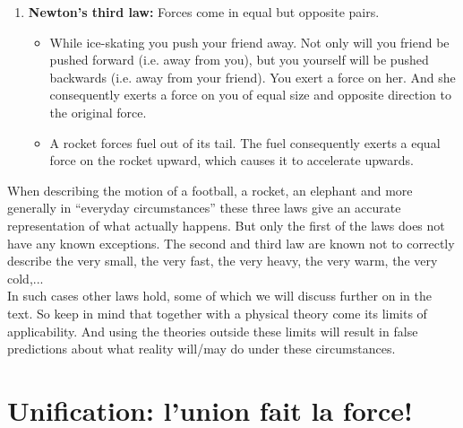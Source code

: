 \begin{enumerate}
\noindent The gravitational force that the earth exerts on a hanging apple is as strong as the gravitational force that the apple exerts on the earth. But it is clearly the apple falling towards the earth and not the other way around. Why? Because the earth is enormously heavier compared to apple. So the change of velocity of the apple is much larger than that of the earth.\\

\noindent Newton's second law contains much more information than I explain here. In the chapters on vectors and on mechanics we will deepen our understanding of the content of this law and its predicted physical consequences.\\

\item \textbf{Newton's third law:} Forces come in equal but opposite pairs.

\begin{itemize}
\item While ice-skating you push your friend away. Not only will you friend be pushed forward (i.e. away from you), but you yourself will be pushed backwards (i.e. away from your friend). You exert a force on her. And she consequently exerts a force on you of equal size and opposite direction to the original force.
\item A rocket forces fuel out of its tail. The fuel consequently exerts a equal force on the rocket upward, which causes it to accelerate upwards.
\end{itemize}

\end{enumerate}

\noindent When describing the motion of a football, a rocket, an elephant and more generally in "`everyday circumstances"' these three laws give an accurate representation of what actually happens. But only the first of the laws does not have any known exceptions. The second and third law are known not to correctly describe the very small, the very fast, the very heavy, the very warm, the very cold,...\\

\noindent In such cases other laws hold, some of which we will discuss further on in the text. So keep in mind that together with a physical theory come its limits of applicability. And using the theories outside these limits will result in false predictions about what reality will/may do under these circumstances.

\section{Unification: l'union fait la force!}

